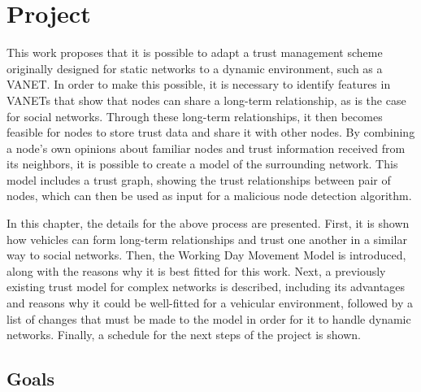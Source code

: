 \chapter{Project}
\label{chap:project}

This work proposes that it is possible to adapt a trust management scheme originally designed for static networks to a dynamic environment, such as a VANET.
In order to make this possible, it is necessary to identify features in VANETs that show that nodes can share a long-term relationship, as is the case for social networks.
Through these long-term relationships, it then becomes feasible for nodes to store trust data and share it with other nodes.
By combining a node's own opinions about familiar nodes and trust information received from its neighbors, it is possible to create a model of the surrounding network.
This model includes a trust graph, showing the trust relationships between pair of nodes, which can then be used as input for a malicious node detection algorithm.


In this chapter, the details for the above process are presented.
First, it is shown how vehicles can form long-term relationships and trust one another in a similar way to social networks.
Then, the Working Day Movement Model is introduced, along with the reasons why it is best fitted for this work.
Next, a previously existing trust model for complex networks is described, including its advantages and reasons why it could be well-fitted for a vehicular environment, followed by a list of changes that must be made to the model in order for it to handle dynamic networks.
Finally, a schedule for the next steps of the project is shown.

\section{Goals}
\label{section:goals}

